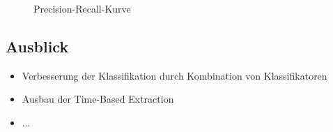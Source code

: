 \documentclass{beamer}
\begin{document}
\begin{frame}[plain]
\begin{figure}
\caption{Precision-Recall-Kurve}
\label{fig:prec-recall}
\end{figure}
\end{frame}

\subsection{Ausblick}
\begin{frame}
  \begin{itemize}
    \item Verbesserung der Klassifikation durch Kombination von Klassifikatoren
    \item Ausbau der Time-Based Extraction
    \item ...
  \end{itemize}
\end{frame}
\end{document}
